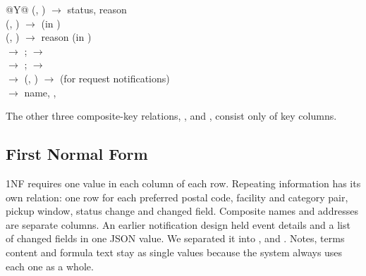 \documentclass[11pt,letterpaper]{article}
\begin{document}
\begin{table}[!ht]
\centering\small
\caption{Functional dependencies relevant to normalization}
\label{tab:fd}
\begin{tabularx}{\linewidth}{@{}Y@{}}
\toprule
(, ) $\rightarrow$ status, reason \\
(, ) $\rightarrow$  \quad (in ) \\
(, ) $\rightarrow$ reason \quad (in ) \\
 $\rightarrow$ ; \quad {} $\rightarrow$  \\
 $\rightarrow$ ; \quad {} $\rightarrow$  \\
 $\rightarrow$ (, ) $\rightarrow$  \quad (for request notifications) \\
 $\rightarrow$ name, ,  \\
\bottomrule
\end{tabularx}
\end{table}

The other three composite-key relations, ,  and , consist only of key columns.

\subsection{First Normal Form}
1NF requires one value in each column of each row. Repeating information has its own relation: one row for each preferred postal code, facility and category pair, pickup window, status change and changed field. Composite names and addresses are separate columns. An earlier notification design held event details and a list of changed fields in one JSON value. We separated it into ,  and . Notes, terms content and formula text stay as single values because the system always uses each one as a whole.
\end{document}
